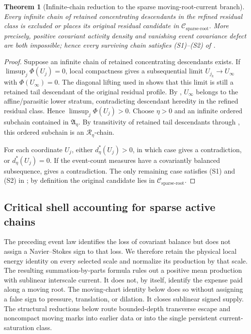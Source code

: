 \documentclass[11pt]{amsart}
\numberwithin{equation}{section}
\theoremstyle{plain}
\newtheorem{theorem}{Theorem}[section]
\theoremstyle{definition}
\theoremstyle{remark}
\newcommand{\Csparse}{\mathcal C_{\mathrm{sparse\text{-}root}}}
\begin{document}
\begin{theorem}[Infinite-chain reduction to the sparse moving-root-current branch]
\label{thm:infinite-chain-sparse-reduction}
Every infinite chain of retained concentrating descendants in the refined
residual class is excluded or places its original residual candidate in
\(\Csparse\).  More precisely, positive covariant activity density and
vanishing event covariance defect are both impossible; hence every surviving
chain satisfies \textup{(S1)}--\textup{(S2)} of
.
\end{theorem}

\begin{proof}
Suppose an infinite chain of retained concentrating descendants exists.  If
\(\limsup_j\Phi(U_j)=0\), local compactness gives a subsequential limit
\(U_{j_k}\to U_\infty\) with \(\Phi(U_\infty)=0\).  The diagonal lifting used in
 shows that this limit is still a
retained tail descendant of the original residual profile.  By
, \(U_\infty\) belongs to the
affine/parasitic lower stratum, contradicting descendant heredity in the
refined residual class.  Hence \(\limsup_j\Phi(U_j)>0\).  Choose
\(\eta>0\) and an infinite ordered subchain contained in \(\mathfrak A_\eta\).
By transitivity of retained tail descendants through
, this ordered subchain is an
\(\mathcal R_\eta\)-chain.

For each coordinate \(U_j\), either \(d_\eta^*(U_j)>0\), in which case
 gives a contradiction, or
\(d_\eta^*(U_j)=0\).  If the event-count measures have a covariantly balanced
subsequence,  gives a
contradiction.  The only remaining case satisfies \textup{(S1)} and
\textup{(S2)} in ; by definition
the original candidate lies in \(\Csparse\).
\end{proof}

\subsection{Critical shell accounting for sparse active chains}

The preceding event law identifies the loss of covariant balance but does not
assign a Navier--Stokes sign to that loss.  We therefore retain the physical
local energy identity on every selected scale and normalize its production by
that scale.  The resulting summation-by-parts formula rules out a positive
mean production with sublinear interscale current.  It does not, by itself,
identify the expense paid along a moving root.  The moving-chart identity below
does so without assigning a false sign to pressure, translation, or dilation.
It closes sublinear signed supply.  The structural reductions below route
bounded-depth transverse escape and noncompact moving marks into earlier data
or into the single persistent current-saturation class.
\end{document}
